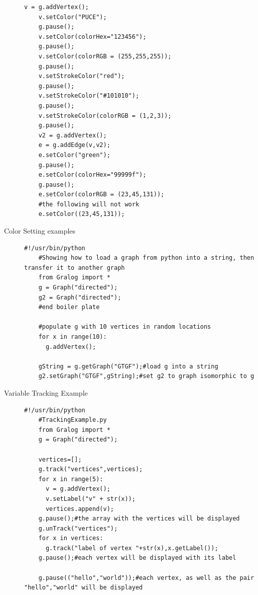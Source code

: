 \begin{description}
\begin{example}
\begin{lstlisting}[title={Color Setting Example},label=colorSettingExample]
    v = g.addVertex();
    v.setColor("PUCE");
    g.pause();
    v.setColor(colorHex="123456");
    g.pause();
    v.setColor(colorRGB = (255,255,255));
    g.pause();
    v.setStrokeColor("red");
    g.pause();
    v.setStrokeColor("#101010");
    g.pause();
    v.setStrokeColor(colorRGB = (1,2,3));
    g.pause();
    v2 = g.addVertex();
    e = g.addEdge(v,v2);
    e.setColor("green");
    g.pause();
    e.setColor(colorHex="99999f");
    g.pause();
    e.setColor(colorRGB = (23,45,131));
    #the following will not work
    e.setColor((23,45,131));
    \end{lstlisting}
  \end{example}
  

\item[Color Setting examples]


  \begin{example}
    \begin{lstlisting}[title={getGraph Example},label=getGraphExample]
    #!/usr/bin/python
    #Showing how to load a graph from python into a string, then transfer it to another graph
    from Gralog import *
    g = Graph("directed");
    g2 = Graph("directed");
    #end boiler plate
    
    #populate g with 10 vertices in random locations
    for x in range(10):
      g.addVertex();
    
    gString = g.getGraph("GTGF");#load g into a string
    g2.setGraph("GTGF",gString);#set g2 to graph isomorphic to g
    \end{lstlisting}
  \end{example}
  
\item[Variable Tracking Example]


  \begin{example}
    \begin{lstlisting}[title={Variable Tracking Example},label=varTrackingExample]
    #!/usr/bin/python
    #TrackingExample.py
    from Gralog import *
    g = Graph("directed");
    
    vertices=[];
    g.track("vertices",vertices);
    for x in range(5):
      v = g.addVertex();
      v.setLabel("v" + str(x));
      vertices.append(v);
    g.pause();#the array with the vertices will be displayed
    g.unTrack("vertices");
    for x in vertices:
      g.track("label of vertex "+str(x),x.getLabel());
    g.pause();#each vertex will be displayed with its label
    
    g.pause(("hello","world"));#each vertex, as well as the pair "hello","world" will be displayed

    \end{lstlisting}
  \end{example}
\end{description}

